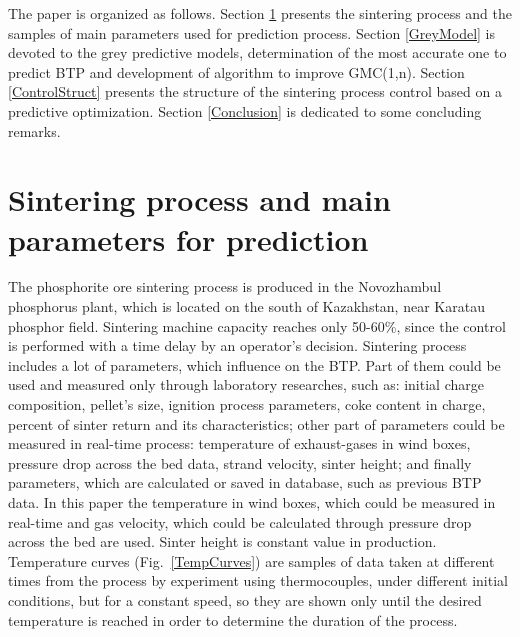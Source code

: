\documentclass[AMS,STIX2COL]{WileyNJD-v2}
\begin{document}
The paper is organized as follows. Section \ref{SintProcess} presents the sintering process and the samples of main parameters used for prediction process. Section \ref{GreyModel} is devoted to the grey predictive models, determination of the most accurate one to predict BTP and development of algorithm to improve GMC(1,n). Section \ref{ControlStruct} presents the structure of the sintering process control based on a predictive optimization. Section \ref{Conclusion} is dedicated to some concluding remarks.

\section{Sintering process and main parameters for prediction} \label{SintProcess}

The phosphorite ore sintering process is produced in the Novozhambul phosphorus plant, which is located on the south of Kazakhstan, near Karatau phosphor field. Sintering machine capacity reaches only 50-60\%, since the control is performed with a time delay by an operator's decision. 
Sintering process includes a lot of parameters, which influence on the BTP. Part of them could be used and measured only through laboratory researches, such as: initial charge composition, pellet's size, ignition process parameters, coke content in charge, percent of sinter return and its characteristics; other part of parameters could be measured in real-time process: temperature of exhaust-gases in wind boxes, pressure drop across the bed data, strand velocity, sinter height; and finally parameters, which are calculated or saved in database, such as previous BTP data. In this paper the temperature in wind boxes, which could be measured in real-time and gas velocity, which could be calculated through pressure drop across the bed are used. Sinter height is constant value in production.  Temperature curves (Fig.~\ref{TempCurves}) are samples of data taken at different times from the process by experiment using thermocouples, under different initial conditions, but for a constant speed, so they are shown only until the desired temperature is reached in order to determine the duration of the process.
\end{document}
